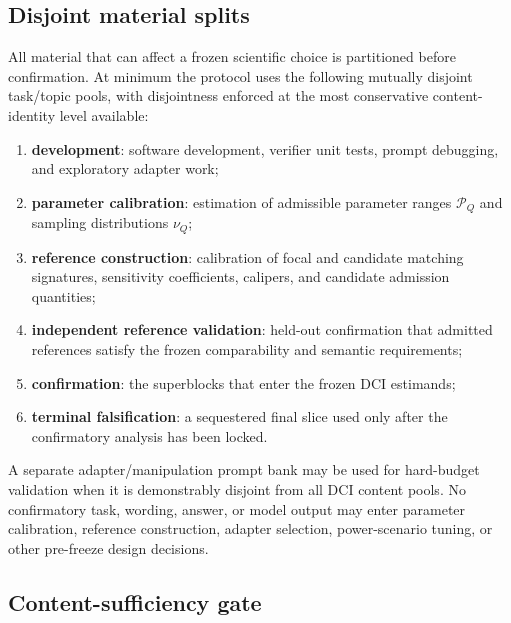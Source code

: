 \documentclass[11pt,a4paper]{article}
\begin{document}
\subsection{Disjoint material splits}

All material that can affect a frozen scientific choice is partitioned before confirmation. At minimum the protocol uses the following mutually disjoint task/topic pools, with disjointness enforced at the most conservative content-identity level available:
\begin{enumerate}
\item \textbf{development}: software development, verifier unit tests, prompt debugging, and exploratory adapter work;
\item \textbf{parameter calibration}: estimation of admissible parameter ranges $\mathcal P_Q$ and sampling distributions $\nu_Q$;
\item \textbf{reference construction}: calibration of focal and candidate matching signatures, sensitivity coefficients, calipers, and candidate admission quantities;
\item \textbf{independent reference validation}: held-out confirmation that admitted references satisfy the frozen comparability and semantic requirements;
\item \textbf{confirmation}: the superblocks that enter the frozen DCI estimands;
\item \textbf{terminal falsification}: a sequestered final slice used only after the confirmatory analysis has been locked.
\end{enumerate}
A separate adapter/manipulation prompt bank may be used for hard-budget validation when it is demonstrably disjoint from all DCI content pools. No confirmatory task, wording, answer, or model output may enter parameter calibration, reference construction, adapter selection, power-scenario tuning, or other pre-freeze design decisions.

\subsection{Content-sufficiency gate}
\end{document}
